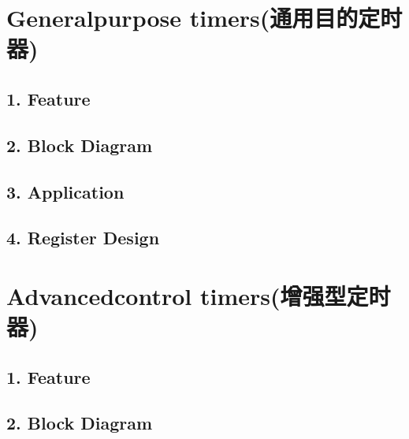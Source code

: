 \documentclass[letterpaper,10pt,english]{sphinxmanual}
\begin{document}
\section{General\sphinxhyphen{}purpose timers(通用目的定时器)}
\label{\detokenize{STM32_u5b9a_u65f6_u5668_u8bbe_u8ba1_u4ecb_u7ecd/STM32_u7684_u5b9a_u65f6_u5668_u8bbe_u8ba1_u4ecb_u7ecd:general-purpose-timers}}

\subsection{1. Feature}
\label{\detokenize{STM32_u5b9a_u65f6_u5668_u8bbe_u8ba1_u4ecb_u7ecd/STM32_u7684_u5b9a_u65f6_u5668_u8bbe_u8ba1_u4ecb_u7ecd:id2}}

\subsection{2. Block Diagram}
\label{\detokenize{STM32_u5b9a_u65f6_u5668_u8bbe_u8ba1_u4ecb_u7ecd/STM32_u7684_u5b9a_u65f6_u5668_u8bbe_u8ba1_u4ecb_u7ecd:id3}}

\subsection{3. Application}
\label{\detokenize{STM32_u5b9a_u65f6_u5668_u8bbe_u8ba1_u4ecb_u7ecd/STM32_u7684_u5b9a_u65f6_u5668_u8bbe_u8ba1_u4ecb_u7ecd:id4}}

\subsection{4. Register Design}
\label{\detokenize{STM32_u5b9a_u65f6_u5668_u8bbe_u8ba1_u4ecb_u7ecd/STM32_u7684_u5b9a_u65f6_u5668_u8bbe_u8ba1_u4ecb_u7ecd:id5}}

\section{Advanced\sphinxhyphen{}control timers(增强型定时器)}
\label{\detokenize{STM32_u5b9a_u65f6_u5668_u8bbe_u8ba1_u4ecb_u7ecd/STM32_u7684_u5b9a_u65f6_u5668_u8bbe_u8ba1_u4ecb_u7ecd:advanced-control-timers}}

\subsection{1. Feature}
\label{\detokenize{STM32_u5b9a_u65f6_u5668_u8bbe_u8ba1_u4ecb_u7ecd/STM32_u7684_u5b9a_u65f6_u5668_u8bbe_u8ba1_u4ecb_u7ecd:id6}}

\subsection{2. Block Diagram}
\label{\detokenize{STM32_u5b9a_u65f6_u5668_u8bbe_u8ba1_u4ecb_u7ecd/STM32_u7684_u5b9a_u65f6_u5668_u8bbe_u8ba1_u4ecb_u7ecd:id7}}
\end{document}
